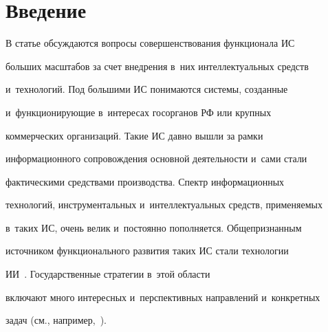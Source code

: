    










 \thispagestyle{headings}

 

 \vspace*{-21pt}

   

\section{Введение}



\vspace*{-5pt}



  В статье обсуждаются вопросы совершенствования функционала ИС 

больших масштабов за счет внедрения в~них интеллектуальных средств 

и~технологий. Под большими ИС понимаются системы, созданные 

и~функционирующие в~интересах госорганов РФ или крупных 

коммерческих организаций. Такие ИС давно вышли за рамки 

информационного сопровождения основной деятельности и~сами стали 

фактическими средствами производства. Спектр информационных 

технологий, инструментальных и~интеллектуальных средств, применяемых 

в~таких ИС, очень велик и~постоянно пополняется. Общепризнанным 

источником функционального развития таких ИС стали технологии 

ИИ~\cite{1-zh, 2-zh, 3-zh}. Государственные стратегии в~этой области 

включают много интересных и~перспективных направлений и~конкретных 

задач (см., например,~\cite{4-zh, 5-zh, 6-zh, 7-zh, 8-zh}).

  


